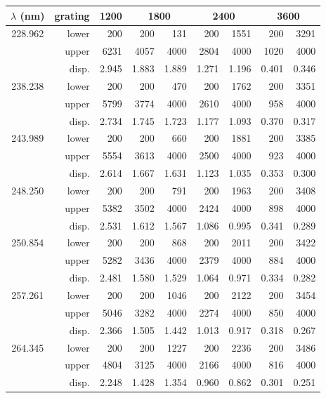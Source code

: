 \begin{tabular}{crrrrrrrr}
\toprule
$\lambda$ (nm)
    & grating & 1200 & \multicolumn{2}{c}{1800}
        & \multicolumn{2}{c}{2400} & \multicolumn{2}{c}{3600} \\
\midrule
\multirow{3}{*}{228.962}
    & lower &   200 &   200 &   131 &   200 &  1551 &   200 &  3291 \\
    & upper &  6231 &  4057 &  4000 &  2804 &  4000 &  1020 &  4000 \\
    & disp. & 2.945 & 1.883 & 1.889 & 1.271 & 1.196 & 0.401 & 0.346 \\
\midrule
\multirow{3}{*}{238.238}
    & lower &   200 &   200 &   470 &   200 &  1762 &   200 &  3351 \\
    & upper &  5799 &  3774 &  4000 &  2610 &  4000 &   958 &  4000 \\
    & disp. & 2.734 & 1.745 & 1.723 & 1.177 & 1.093 & 0.370 & 0.317 \\
\midrule
\multirow{3}{*}{243.989}
    & lower &   200 &   200 &   660 &   200 &  1881 &   200 &  3385 \\
    & upper &  5554 &  3613 &  4000 &  2500 &  4000 &   923 &  4000 \\
    & disp. & 2.614 & 1.667 & 1.631 & 1.123 & 1.035 & 0.353 & 0.300 \\
\midrule
\multirow{3}{*}{248.250}
    & lower &   200 &   200 &   791 &   200 &  1963 &   200 &  3408 \\
    & upper &  5382 &  3502 &  4000 &  2424 &  4000 &   898 &  4000 \\
    & disp. & 2.531 & 1.612 & 1.567 & 1.086 & 0.995 & 0.341 & 0.289 \\
\midrule
\multirow{3}{*}{250.854}
    & lower &   200 &   200 &   868 &   200 &  2011 &   200 &  3422 \\
    & upper &  5282 &  3436 &  4000 &  2379 &  4000 &   884 &  4000 \\
    & disp. & 2.481 & 1.580 & 1.529 & 1.064 & 0.971 & 0.334 & 0.282 \\
\midrule
\multirow{3}{*}{257.261}
    & lower &   200 &   200 &  1046 &   200 &  2122 &   200 &  3454 \\
    & upper &  5046 &  3282 &  4000 &  2274 &  4000 &   850 &  4000 \\
    & disp. & 2.366 & 1.505 & 1.442 & 1.013 & 0.917 & 0.318 & 0.267 \\
\midrule
\multirow{3}{*}{264.345}
    & lower &   200 &   200 &  1227 &   200 &  2236 &   200 &  3486 \\
    & upper &  4804 &  3125 &  4000 &  2166 &  4000 &   816 &  4000 \\
    & disp. & 2.248 & 1.428 & 1.354 & 0.960 & 0.862 & 0.301 & 0.251 \\
\bottomrule
\end{tabular}

